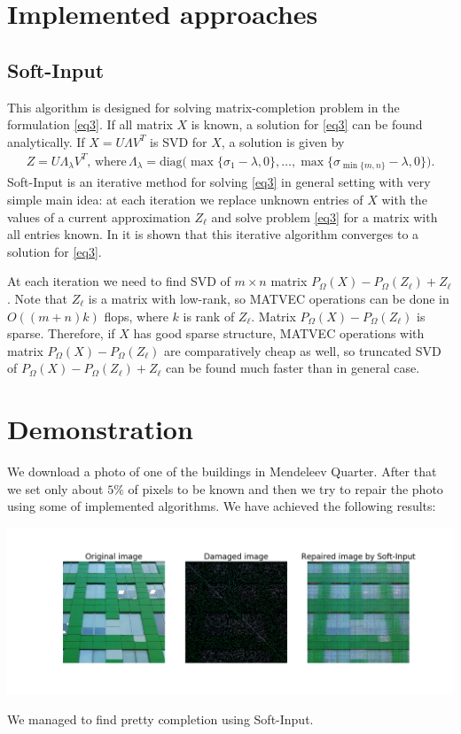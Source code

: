 \documentclass[12pt]{article}
\begin{document}
\section{Implemented approaches}

\subsection{Soft-Input}
This algorithm is designed for solving matrix-completion problem in the formulation \ref{eq3}. If all matrix $X$ is known, a solution for \ref{eq3} can be found analytically. If $X = U \Lambda V^T$ is SVD for $X$, a solution is given by
\begin{align*}
Z = U \Lambda_{\lambda} V^T, \, \text{where} \, \Lambda_{\lambda} = \mathrm{diag}\Big(\max\{\sigma_1 - \lambda, 0\}, \dots, \max\{\sigma_{\min\{m, n\}} - \lambda, 0\}\Big).
\end{align*}
Soft-Input is an iterative method for solving \ref{eq3} in general setting with very simple main idea: at each iteration we replace unknown entries of $X$ with the values of a current approximation $Z_\ell$ and solve problem \ref{eq3} for a matrix with all entries known. In \cite{1} it is shown that this iterative algorithm converges to a solution for \ref{eq3}. 

At each iteration we need to find SVD of $m \times n$ matrix $P_{\Omega}(X) - P_{\Omega}(Z_\ell) + Z_\ell$. Note that $Z_\ell$ is a matrix with low-rank, so MATVEC operations can be done in $O((m + n) k)$ flops, where $k$ is rank of $Z_\ell$. Matrix $P_{\Omega}(X) - P_{\Omega}(Z_\ell)$ is sparse. Therefore, if $X$ has good sparse structure, MATVEC operations with matrix $P_{\Omega}(X) - P_{\Omega}(Z_\ell)$ are comparatively cheap as well, so truncated SVD of $P_{\Omega}(X) - P_{\Omega}(Z_\ell) + Z_\ell$ can be found much faster than in general case.



\section{Demonstration}

We download a photo of one of the buildings in Mendeleev Quarter. After that we set only about $5\%$ of pixels to be known and then we try to repair the photo using some of implemented algorithms. We have achieved the following results:
\begin{center}
\includegraphics[scale = 0.4]{../Code/demo.png}
\end{center}
We managed to find pretty completion using Soft-Input.
\end{document}
